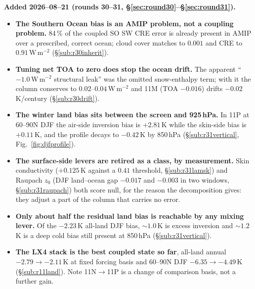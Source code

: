\documentclass[10pt]{article}
\begin{document}
\textbf{Added 2026--08--21 (rounds 30--31, \S\ref{sec:round30}--\S\ref{sec:round31}).}
\begin{itemize}\itemsep2pt
\item \textbf{The Southern Ocean bias is an AMIP problem, not a coupling problem.} 84\,\%
of the coupled SO SW CRE error is already present in AMIP over a prescribed, correct
ocean; cloud cover matches to $0.001$ and CRE to $0.91$\,W\,m$^{-2}$
(\S\ref{sub:r30inherit}).
\item \textbf{Tuning net TOA to zero does stop the ocean drift.} The apparent
``$-1.0$\,W\,m$^{-2}$ structural leak'' was the omitted snow-enthalpy term; with it the
column conserves to $0.02$--$0.04$\,W\,m$^{-2}$ and 11M (TOA $-0.016$) drifts
$-0.02$\,K/century (\S\ref{sub:r30drift}).
\item \textbf{The winter land bias sits between the screen and 925\,hPa.} In 11P at
60--90N DJF the air-side inversion bias is $+2.81$\,K while the skin-side bias is
$+0.11$\,K, and the profile decays to $-0.42$\,K by 850\,hPa (\S\ref{sub:r31vertical},
Fig.~\ref{fig:djfprofile}).
\item \textbf{The surface-side levers are retired as a class, by measurement.} Skin
conductivity ($+0.125$\,K against a $0.41$ threshold, \S\ref{sub:r31lamsk}) and Raupach
$z_0$ (DJF land--ocean gap $-0.017$ and $-0.003$ in two windows,
\S\ref{sub:r31raupach}) both score null, for the reason the decomposition gives: they
adjust a part of the column that carries no error.
\item \textbf{Only about half the residual land bias is reachable by any mixing lever.}
Of the $-2.23$\,K all-land DJF bias, ${\sim}1.0$\,K is excess inversion and ${\sim}1.2$\,K
is a deep cold bias still present at 850\,hPa (\S\ref{sub:r31vertical}).
\item \textbf{The LX4 stack is the best coupled state so far}, all-land annual
$-2.79\to-2.11$\,K at fixed forcing basis and 60--90N DJF $-6.35\to-4.49$\,K
(\S\ref{sub:r11land}). Note 11N$\to$11P is a change of comparison basis, not a further
gain.
\end{itemize}
\end{document}
